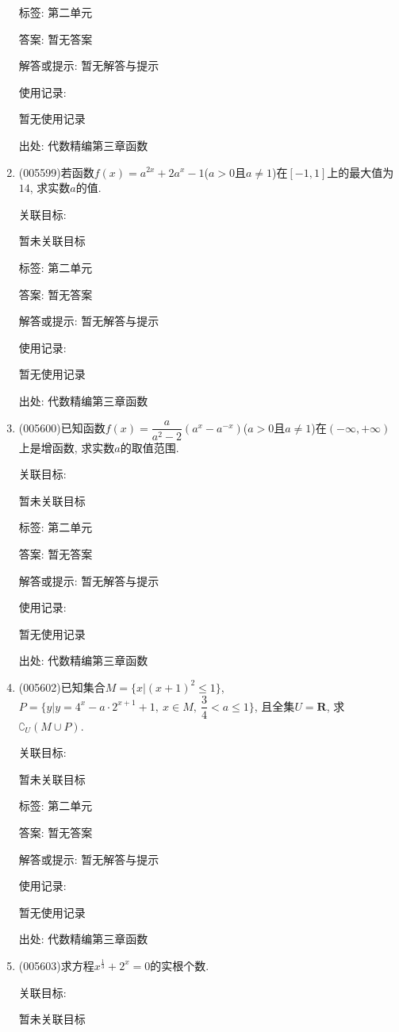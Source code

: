 \documentclass[10pt,a4paper]{article}
\begin{document}
\begin{enumerate}[1.]
标签: 第二单元

答案: 暂无答案

解答或提示: 暂无解答与提示

使用记录:

暂无使用记录


出处: 代数精编第三章函数
\item { (005599)}若函数$f(x)=a^{2x}+2a^x-1$($a>0$且$a\ne 1$)在$[-1, 1]$上的最大值为$14$, 求实数$a$的值.


关联目标:

暂未关联目标



标签: 第二单元

答案: 暂无答案

解答或提示: 暂无解答与提示

使用记录:

暂无使用记录


出处: 代数精编第三章函数
\item { (005600)}已知函数$f(x)=\dfrac a{a^2-2}(a^x-a^{-x})$($a>0$且$a\ne 1$)在$(-\infty ,+\infty)$上是增函数, 求实数$a$的取值范围.


关联目标:

暂未关联目标



标签: 第二单元

答案: 暂无答案

解答或提示: 暂无解答与提示

使用记录:

暂无使用记录


出处: 代数精编第三章函数
\item { (005602)}已知集合$M=\{x|(x+1)^2\le 1\}$, $P=\{y|y=4^x-a\cdot 2^{x+1}+1,\ x\in M,\ \dfrac 34<a\le 1\}$, 且全集$U=\mathbf{R}$, 求$\complement _U(M\cup P)$.


关联目标:

暂未关联目标



标签: 第二单元

答案: 暂无答案

解答或提示: 暂无解答与提示

使用记录:

暂无使用记录


出处: 代数精编第三章函数
\item { (005603)}求方程$x^{\frac 13}+2^x=0$的实根个数.


关联目标:

暂未关联目标




\end{enumerate}
\end{document}
